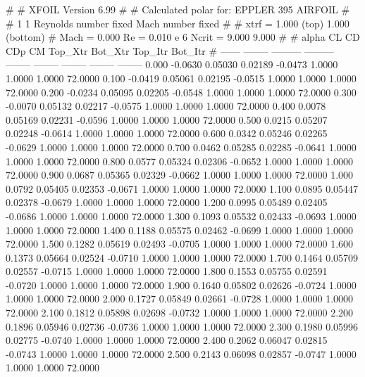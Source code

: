 #  
#       XFOIL         Version 6.99
#  
# Calculated polar for: EPPLER 395 AIRFOIL                              
#  
# 1 1 Reynolds number fixed          Mach number fixed         
#  
# xtrf =   1.000 (top)        1.000 (bottom)  
# Mach =   0.000     Re =     0.010 e 6     Ncrit =   9.000  9.000
#  
#   alpha    CL        CD       CDp       CM     Top_Xtr  Bot_Xtr  Top_Itr  Bot_Itr
#  ------ -------- --------- --------- -------- -------- -------- -------- --------
   0.000  -0.0630   0.05030   0.02189  -0.0473   1.0000   1.0000   1.0000  72.0000
   0.100  -0.0419   0.05061   0.02195  -0.0515   1.0000   1.0000   1.0000  72.0000
   0.200  -0.0234   0.05095   0.02205  -0.0548   1.0000   1.0000   1.0000  72.0000
   0.300  -0.0070   0.05132   0.02217  -0.0575   1.0000   1.0000   1.0000  72.0000
   0.400   0.0078   0.05169   0.02231  -0.0596   1.0000   1.0000   1.0000  72.0000
   0.500   0.0215   0.05207   0.02248  -0.0614   1.0000   1.0000   1.0000  72.0000
   0.600   0.0342   0.05246   0.02265  -0.0629   1.0000   1.0000   1.0000  72.0000
   0.700   0.0462   0.05285   0.02285  -0.0641   1.0000   1.0000   1.0000  72.0000
   0.800   0.0577   0.05324   0.02306  -0.0652   1.0000   1.0000   1.0000  72.0000
   0.900   0.0687   0.05365   0.02329  -0.0662   1.0000   1.0000   1.0000  72.0000
   1.000   0.0792   0.05405   0.02353  -0.0671   1.0000   1.0000   1.0000  72.0000
   1.100   0.0895   0.05447   0.02378  -0.0679   1.0000   1.0000   1.0000  72.0000
   1.200   0.0995   0.05489   0.02405  -0.0686   1.0000   1.0000   1.0000  72.0000
   1.300   0.1093   0.05532   0.02433  -0.0693   1.0000   1.0000   1.0000  72.0000
   1.400   0.1188   0.05575   0.02462  -0.0699   1.0000   1.0000   1.0000  72.0000
   1.500   0.1282   0.05619   0.02493  -0.0705   1.0000   1.0000   1.0000  72.0000
   1.600   0.1373   0.05664   0.02524  -0.0710   1.0000   1.0000   1.0000  72.0000
   1.700   0.1464   0.05709   0.02557  -0.0715   1.0000   1.0000   1.0000  72.0000
   1.800   0.1553   0.05755   0.02591  -0.0720   1.0000   1.0000   1.0000  72.0000
   1.900   0.1640   0.05802   0.02626  -0.0724   1.0000   1.0000   1.0000  72.0000
   2.000   0.1727   0.05849   0.02661  -0.0728   1.0000   1.0000   1.0000  72.0000
   2.100   0.1812   0.05898   0.02698  -0.0732   1.0000   1.0000   1.0000  72.0000
   2.200   0.1896   0.05946   0.02736  -0.0736   1.0000   1.0000   1.0000  72.0000
   2.300   0.1980   0.05996   0.02775  -0.0740   1.0000   1.0000   1.0000  72.0000
   2.400   0.2062   0.06047   0.02815  -0.0743   1.0000   1.0000   1.0000  72.0000
   2.500   0.2143   0.06098   0.02857  -0.0747   1.0000   1.0000   1.0000  72.0000
